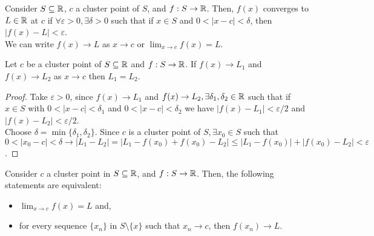 \begin{definition}
    Consider $S \subseteq \mathbb{R}$, $c$ a cluster point of $S$, and $f: S \to \mathbb{R}$. Then, $f(x)$ converges to $L \in \mathbb{R}$ at $c$ if $\forall \varepsilon > 0, \exists \delta > 0$ such that if $x \in S$ and $0 < |x-c| < \delta$, then $|f(x) - L| < \varepsilon$. \\
    We can write $f(x) \to L$ as $x \to c$ or $\lim_{x \to c} f(x) = L$.
\end{definition}

\begin{theorem}
    Let $c$ be a cluster point of $S \subseteq \mathbb{R}$ and $f: S \to \mathbb{R}$. If $f(x) \to L_1$ and $f(x) \to L_2$ as $x \to c$ then $L_1 = L_2$.
\end{theorem}

\begin{proof}
    Take $\varepsilon > 0$, since $f(x) \to L_1$ and $f(x) \to L_2, \exists \delta_1, \delta_2 \in \mathbb{R}$ such that if $x \in S$ with $0 < |x-c| < \delta_1$ and $0 < |x-c| < \delta_2$ we have $|f(x) - L_1| < \varepsilon/2$ and $|f(x) - L_2| < \varepsilon/2$. \\
    Choose $\delta = \min\{\delta_1, \delta_2\}$. Since $c$ is a cluster point of $S, \exists x_0 \in S$ such that $0 < |x_0-c| < \delta \longrightarrow |L_1-L_2| = |L_1 - f(x_0) + f(x_0) - L_2| \leq |L_1 - f(x_0)| + |f(x_0) - L_2| < \varepsilon$.
\end{proof}

\begin{theorem}
    Consider $c$ a cluster point in $S \subseteq \mathbb{R}$, and $f: S \to \mathbb{R}$. Then, the following statements are equivalent:
    \begin{itemize}
        \item $\lim_{x \to c} f(x) = L$ and,
        \item for every sequence $\{x_n\}$ in $S \setminus \{x\}$ such that $x_n \to c$, then $f(x_n) \to L$.
    \end{itemize}
\end{theorem}

